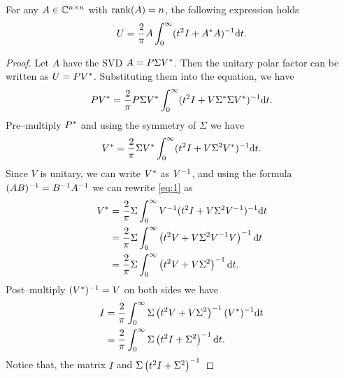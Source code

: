 \documentclass[12pt]{article}
\begin{document}
\begin{theorem}
	\label{thm:integralOfPolarFactor}
    For any $A\in\mathbb{C}^{n\times n}$ with $\mathrm{rank}(A) = n$, the following expression holds 
    \begin{equation}
        \label{eq:proof2.3} 
        U = \frac{2}{\pi} A \int_0^\infty (t^2 I + A ^* A)^{-1} \mathrm{d} t.
    \end{equation}
\end{theorem}

\begin{proof}
    Let $A$ have the SVD $A = P\Sigma V^*$. Then the unitary polar factor can be written as $U = PV^*$. Substituting them into the equation, we have 
    \begin{equation}
        \notag 
        PV^*  = \frac{2}{\pi} P\Sigma V^* \int_0^\infty (t^2 I + V\Sigma^* \Sigma V^*)^{-1} \mathrm{d} t.
    \end{equation}
    Pre--multiply $P^*$ and using the symmetry of $\Sigma$ we have 
    \begin{equation}
        \label{eq:1} 
        V^* = \frac{2}{\pi} \Sigma V^* \int_0^\infty (t^2 I + V\Sigma^2 V^*)^{-1} \mathrm{d} t.
    \end{equation}
    Since $V$ is unitary, we can write $V^*$ as $V^{-1}$, and using the formula $(AB)^{-1} = B^{-1} A^{-1}$ we can rewrite \eqref{eq:1} as 
    \begin{equation}
        \notag 
        \begin{aligned}
            V^* &= \frac{2}{\pi} \Sigma \int_0^\infty V^{-1} (t^2 I + V\Sigma^2 V^{-1})^{-1} \mathrm{d} t\\
            & = \frac{2}{\pi}\Sigma\int_0^\infty \left(t^2 V + V\Sigma^2 V^{-1} V\right)^{-1} \mathrm{d} t \\
            & = \frac{2}{\pi} \Sigma \int_0^\infty \left(t^2V + V\Sigma^2\right)^{-1} \mathrm{d} t.
        \end{aligned}
    \end{equation}
    Post--multiply $(V^*)^{-1} = V$ on both sides we have 
    \begin{equation}
        \notag 
        \begin{aligned}
            I &= \frac{2}{\pi}\int_0^\infty \Sigma \left(t^2 V + V \Sigma^2 \right)^{-1} (V^*)^{-1} \mathrm{d} t \\
            & = \frac{2}{\pi}\int_0^\infty \Sigma \left(t^2 I + \Sigma^2\right)^{-1} \mathrm{d} t.
        \end{aligned}
    \end{equation}
    Notice that, the matrix $I$ and $\Sigma\left(t^2 I + \Sigma^2\right)^{-1}$ 

\end{proof}
\end{document}
